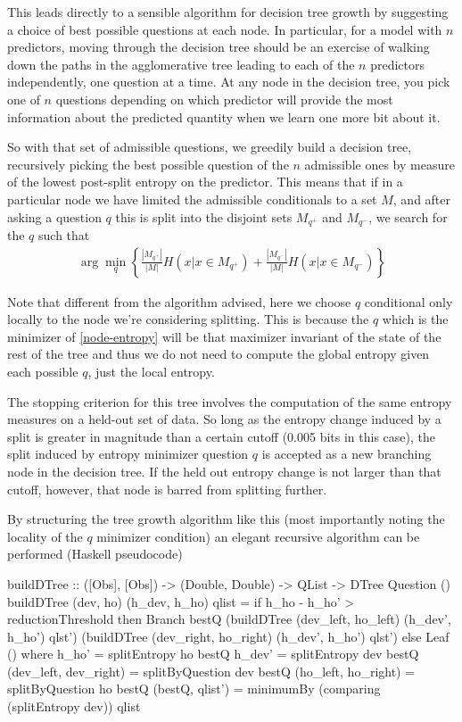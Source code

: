 \documentclass[12pt]{article}
\begin{document}
This leads directly to a sensible algorithm for decision tree growth
by suggesting a choice of best possible questions at each node. In
particular, for a model with $n$ predictors, moving through the
decision tree should be an exercise of walking down the paths in the
agglomerative tree leading to each of the $n$ predictors
independently, one question at a time. At any node in the decision
tree, you pick one of $n$ questions depending on which predictor will
provide the most information about the predicted quantity when we
learn one more bit about it.

So with that set of admissible questions, we greedily build a decision
tree, recursively picking the best possible question of the $n$
admissible ones by measure of the lowest post-split entropy on the
predictor. This means that if in a particular node we have limited the
admissible conditionals to a set $M$, and after asking a question $q$
this is split into the disjoint sets $M_{q^+}$ and $M_{q^-}$, we
search for the $q$ such that
\begin{align}
  \arg\min_q \left\{ \frac{|M_{q^+}|}{|M|}H(x | x \in M_{q^+}) +
  \frac{|M_{q^-}|}{|M|}H(x | x \in M_{q^-})\right\} \label{node-entropy}
\end{align}

Note that different from the algorithm advised, here we choose $q$
conditional only locally to the node we're considering splitting. This
is because the $q$ which is the minimizer of \eqref{node-entropy} will
be that maximizer invariant of the state of the rest of the tree and
thus we do not need to compute the global entropy given each possible
$q$, just the local entropy.

The stopping criterion for this tree involves the computation of the
same entropy measures on a held-out set of data. So long as the
entropy change induced by a split is greater in magnitude than a
certain cutoff (0.005 bits in this case), the split induced by entropy
minimizer question $q$ is accepted as a new branching node in the
decision tree. If the held out entropy change is not larger than that
cutoff, however, that node is barred from splitting further.

By structuring the tree growth algorithm like this (most importantly
noting the locality of the $q$ minimizer condition) an elegant
recursive algorithm can be performed (Haskell pseudocode)

\begin{code}
buildDTree :: ([Obs], [Obs]) -> (Double, Double) -> QList -> DTree Question ()
buildDTree (dev, ho) (h_dev, h_ho) qlist = 
  if h_ho - h_ho' > reductionThreshold
  then Branch bestQ (buildDTree (dev_left, ho_left) (h_dev', h_ho') qlst')
                    (buildDTree (dev_right, ho_right) (h_dev', h_ho') qlst')
  else Leaf ()
  where
    h_ho'  = splitEntropy ho bestQ
    h_dev' = splitEntropy dev bestQ
    (dev_left, dev_right) = splitByQuestion dev bestQ
    (ho_left, ho_right) = splitByQuestion ho bestQ
    (bestQ, qlist') = minimumBy (comparing (splitEntropy dev)) qlist
\end{code}
\end{document}
